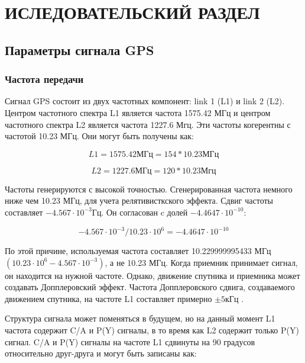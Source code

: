 \section{ИСЛЕДОВАТЕЛЬСКИЙ РАЗДЕЛ}

\subsection{Параметры сигнала GPS}
\label{razdel11}
\subsubsection{Частота передачи}
Сигнал GPS состоит из двух частотных компонент: link 1 (L1) и link 2 (L2). Центром частотного спектра L1 является
частота 1575.42 МГц и центром частотного спектра L2 является частота 1227.6 Мгц. Эти частоты когерентны с
частотой 10.23 МГц. Они могут быть получены как:

\begin{equation}
L1=1575.42\mbox{МГц}=154*10.23\mbox{МГц}
\label{eq:l1_freq}
\end{equation}

\begin{equation}
L2=1227.6\mbox{МГц}=120*10.23\mbox{Мгц}
\label{eq:l2_freq}
\end{equation}

Частоты генерируются с высокой точностью. Сгенерированная частота немного ниже чем 10.23 МГц, для учета 
релятивисткского эффекта. Сдвиг частоты составляет ${-4.567\cdot10^{-3}\mbox{Гц}}$. Он согласован c долей
${-4.4647\cdot10^{-10}}$:

\begin{equation}
-4.567\cdot10^{-3}/10.23\cdot10^{6} = -4.4647\cdot10^{-10}
\end{equation}

По этой причине, используемая частота составляет 10.229999995433 МГц ${(10.23\cdot10^{6} - 4.567\cdot10^{-3})}$,
а не 10.23 МГц. Когда приемник принимает сигнал, он находится
на нужной частоте. Однако, движение спутника и приемника может создавать Допплеровский эффект. Частота Допплеровского
сдвига, создаваемого движением спутника, на частоте L1 составляет примерно ${\pm5\mbox{кГц}}$ \cite{yacenkov, tsui}.

Структура сигнала может поменяться в будущем, но на данный момент L1 частота содержит C/A и P(Y) сигналы, в то
время как L2 содержит только P(Y) сигнал. C/A и P(Y) сигналы на частоте L1 сдвинуты на 90 градусов
относительно друг-друга и могут быть записаны как:

